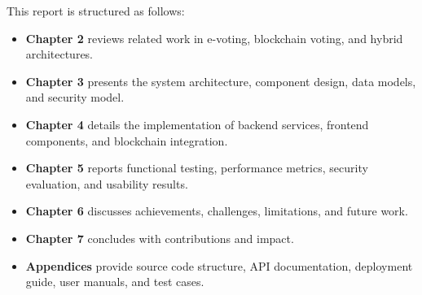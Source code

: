 This report is structured as follows:
\begin{itemize}
    \item \textbf{Chapter 2} reviews related work in e-voting, blockchain voting,
    and hybrid architectures.
    \item \textbf{Chapter 3} presents the system architecture, component design,
    data models, and security model.
    \item \textbf{Chapter 4} details the implementation of backend services,
    frontend components, and blockchain integration.
    \item \textbf{Chapter 5} reports functional testing, performance metrics,
    security evaluation, and usability results.
    \item \textbf{Chapter 6} discusses achievements, challenges, limitations,
    and future work.
    \item \textbf{Chapter 7} concludes with contributions and impact.
    \item \textbf{Appendices} provide source code structure, API documentation,
    deployment guide, user manuals, and test cases.
\end{itemize}